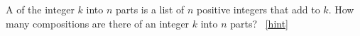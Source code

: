 \documentclass{book}
\begin{document}
\setcounter{project}{128}
\addtocounter{project}{-1}
\begin{activity}[]\label{compositionagian}
\hypertarget{p-903}{}%
A  of the integer \(k\) into \(n\) parts is a list of \(n\) positive integers that add to \(k\).  How many compositions are there of an integer \(k\) into \(n\) parts?%
~\hfill{\tiny\hyperlink{a-128}{[hint]}\hypertarget{q-128}{}}\end{activity}
\end{document}
